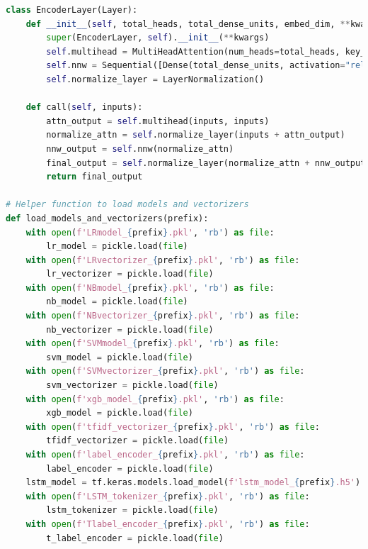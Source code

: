 \begin{tcolorbox}[colback=gray!5!white, colframe=gray!80!black, boxrule=0.5pt, title=Hierarchical Ensemble Model 1] 
    \begin{lstlisting}[language=Python]
class EncoderLayer(Layer):
    def __init__(self, total_heads, total_dense_units, embed_dim, **kwargs):
        super(EncoderLayer, self).__init__(**kwargs)
        self.multihead = MultiHeadAttention(num_heads=total_heads, key_dim=embed_dim)
        self.nnw = Sequential([Dense(total_dense_units, activation="relu"), Dense(embed_dim)])
        self.normalize_layer = LayerNormalization()

    def call(self, inputs):
        attn_output = self.multihead(inputs, inputs)
        normalize_attn = self.normalize_layer(inputs + attn_output)
        nnw_output = self.nnw(normalize_attn)
        final_output = self.normalize_layer(normalize_attn + nnw_output)
        return final_output

# Helper function to load models and vectorizers
def load_models_and_vectorizers(prefix):
    with open(f'LRmodel_{prefix}.pkl', 'rb') as file:
        lr_model = pickle.load(file)
    with open(f'LRvectorizer_{prefix}.pkl', 'rb') as file:
        lr_vectorizer = pickle.load(file)
    with open(f'NBmodel_{prefix}.pkl', 'rb') as file:
        nb_model = pickle.load(file)
    with open(f'NBvectorizer_{prefix}.pkl', 'rb') as file:
        nb_vectorizer = pickle.load(file)
    with open(f'SVMmodel_{prefix}.pkl', 'rb') as file:
        svm_model = pickle.load(file)
    with open(f'SVMvectorizer_{prefix}.pkl', 'rb') as file:
        svm_vectorizer = pickle.load(file)
    with open(f'xgb_model_{prefix}.pkl', 'rb') as file:
        xgb_model = pickle.load(file)
    with open(f'tfidf_vectorizer_{prefix}.pkl', 'rb') as file:
        tfidf_vectorizer = pickle.load(file)
    with open(f'label_encoder_{prefix}.pkl', 'rb') as file:
        label_encoder = pickle.load(file)
    lstm_model = tf.keras.models.load_model(f'lstm_model_{prefix}.h5')
    with open(f'LSTM_tokenizer_{prefix}.pkl', 'rb') as file:
        lstm_tokenizer = pickle.load(file)
    with open(f'Tlabel_encoder_{prefix}.pkl', 'rb') as file:
        t_label_encoder = pickle.load(file)
        \end{lstlisting}
    \end{tcolorbox}
